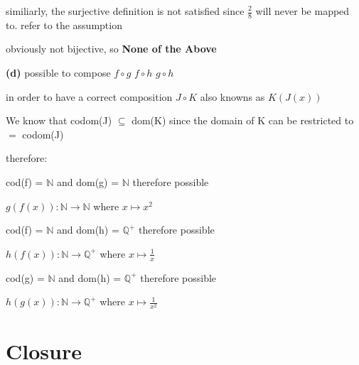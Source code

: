 \documentclass[12pts,A4]{article}
\begin{document}
\begin{flushleft}
    similiarly, the surjective definition is not satisfied since $\frac{2}{8}$ will never be mapped to. refer to the assumption

    obviously not bijective, so \textbf{None of the Above}

\bigskip

    \textbf{(d)} possible to compose $ f \circ g $ $ f\circ h  $ $ g \circ h$ 
     
    in order to have a correct composition $ J \circ K$ also knowns as $ K(J(x)) $

    We know that codom(J) $\subseteq$ dom(K) since the domain of K can be restricted to $=$ codom(J)

    therefore:  


    cod(f) = $\mathbb{N}$  and dom(g) = $\mathbb{N}$ therefore possible 

    $g(f(x)): \mathbb{N} \rightarrow \mathbb{N}$ where $ x \mapsto x^{2}$


    cod(f) = $\mathbb{N}$  and dom(h) = $\mathbb{Q^{+}}$ therefore possible 
    
    $h(f(x)): \mathbb{N} \rightarrow \mathbb{Q^{+}}$ where $ x \mapsto \frac{1}{x}$

    cod(g) = $\mathbb{N}$  and dom(h) = $\mathbb{Q^{+}}$ therefore possible 
    
    $h(g(x)): \mathbb{N} \rightarrow \mathbb{Q^{+}}$ where $ x \mapsto \frac{1}{x^{2}}$
\end{flushleft}

\section{Closure}
\end{document}
